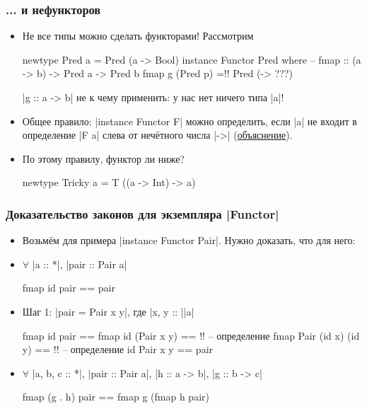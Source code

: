 \documentclass[11pt]{beamer}
\begin{document}
\begin{frame}[fragile]
  \frametitle{... и нефункторов}
  \begin{itemize}
    \item Не все типы можно сделать функторами! Рассмотрим
          \begin{haskell}
            newtype Pred a = Pred (a -> Bool)
            instance Functor Pred where 
            -- fmap :: (a -> b) -> Pred a -> Pred b
            fmap g (Pred p) =!\pause! Pred (\x -> ???)
          \end{haskell}
          \pause \haskinline|g :: a -> b| не к чему применить: у нас нет ничего типа \haskinline|a|!
          \pause
    \item Общее правило: \haskinline|instance Functor F| можно определить, если \haskinline|a| не входит в определение \haskinline|F a| слева от нечётного числа \haskinline|->| (\href{https://downloads.haskell.org/~ghc/8.6.3/docs/html/users_guide/glasgow_exts.html#deriving-functor-instances}{объяснение}).
          \pause
    \item По этому правилу, функтор ли ниже?
          \begin{haskell}
            newtype Tricky a = T ((a -> Int) -> a)
          \end{haskell}
  \end{itemize}
\end{frame}

\begin{frame}[fragile]
  \frametitle{Доказательство законов для экземпляра \haskinline|Functor|}
  \begin{itemize}
    \item Возьмём для примера \haskinline|instance Functor Pair|. Нужно доказать, что для него:
    \item $\forall$ \haskinline|a :: *|, \haskinline|pair :: Pair a|
          \begin{haskell}
            fmap id pair == pair
          \end{haskell}
          \pause
    \item Шаг 1: \haskinline|pair = Pair x y|, где \haskinline|x, y :: |\pause\haskinline|a|
          \begin{haskell}
            fmap id pair ==
            fmap id (Pair x y) == !\pause! -- определение fmap \pause
            Pair (id x) (id y) == !\pause! -- определение id \pause
            Pair x y == 
            pair
          \end{haskell}
          \pause
    \item $\forall$ \haskinline|a, b, c :: *|, \haskinline|pair :: Pair a|, \haskinline|h :: a -> b|, \haskinline|g :: b -> c|
          \begin{haskell}
            fmap (g . h) pair == fmap g (fmap h pair)
          \end{haskell}
  \end{itemize}
\end{frame}
\end{document}
